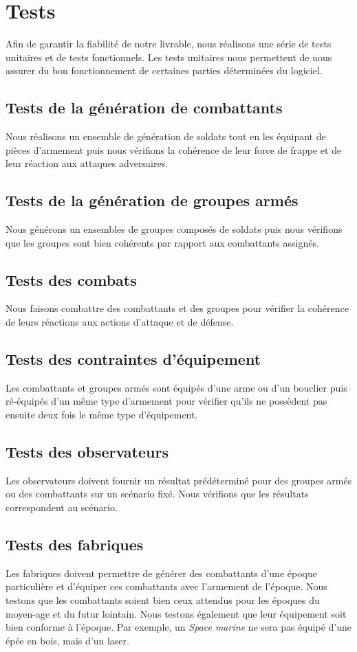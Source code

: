 \section{Tests}

Afin de garantir la fiabilité de notre livrable, nous réalisons une série de tests unitaires et de tests fonctionnels. Les tests unitaires nous permettent de nous assurer du bon fonctionnement de certaines parties déterminées du logiciel. 

\subsection{Tests de la génération de combattants}
Nous réalisons un ensemble de génération de soldats tout en les équipant de pièces
d'armement puis nous vérifions la cohérence de leur force de frappe et de leur réaction
aux attaques adversaires.

\subsection{Tests de la génération de groupes armés}
Nous générons un ensembles de groupes composés de soldats puis nous vérifions que les groupes
sont bien cohérents par rapport aux combattants assignés.

\subsection{Tests des combats}
Nous faisons combattre des combattants et des groupes pour vérifier la cohérence de leurs réactions aux actions d'attaque et de défense.

\subsection{Tests des contraintes d'équipement}
Les combattants et groupes armés sont équipés d'une arme ou d'un bouclier puis ré-équipés d'un même type
d'armement pour vérifier qu'ils ne possèdent pas ensuite deux fois le même type d'équipement.

\subsection{Tests des observateurs}
Les observateurs doivent fournir un résultat prédéterminé pour des groupes armés ou des combattants sur
un scénario fixé. Nous vérifions que les résultats correspondent au scénario.

\subsection{Tests des fabriques}
Les fabriques doivent permettre de générer des combattants d'une époque particulière et d'équiper ces combattants
avec l'armement de l'époque. Nous testons que les combattants soient bien ceux attendus pour les époques du
moyen-age et du futur lointain. Nous testons également que leur équipement soit bien conforme à l'époque. Par
exemple, un \emph{Space marine} ne sera pas équipé d'une épée en bois, mais d'un laser.